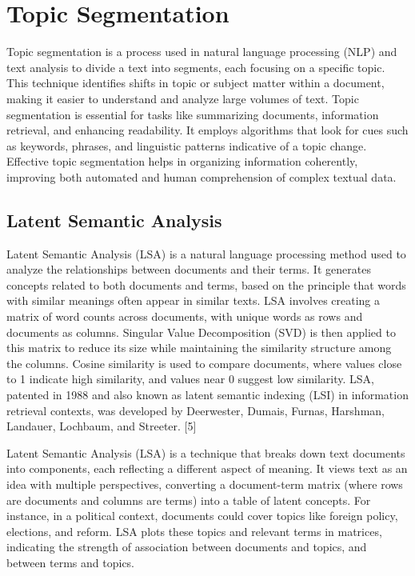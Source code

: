 \section*{Topic Segmentation}

Topic segmentation is a process used in natural language processing (NLP) and text analysis to divide a text into segments, each focusing on a specific topic. This technique identifies shifts in topic or subject matter within a document, making it easier to understand and analyze large volumes of text. Topic segmentation is essential for tasks like summarizing documents, information retrieval, and enhancing readability. It employs algorithms that look for cues such as keywords, phrases, and linguistic patterns indicative of a topic change. Effective topic segmentation helps in organizing information coherently, improving both automated and human comprehension of complex textual data.  




\subsection*{Latent Semantic Analysis}

Latent Semantic Analysis (LSA) is a natural language processing method used to analyze the relationships between documents and their terms. It generates concepts related to both documents and terms, based on the principle that words with similar meanings often appear in similar texts. LSA involves creating a matrix of word counts across documents, with unique words as rows and documents as columns. Singular Value Decomposition (SVD) is then applied to this matrix to reduce its size while maintaining the similarity structure among the columns. Cosine similarity is used to compare documents, where values close to 1 indicate high similarity, and values near 0 suggest low similarity. LSA, patented in 1988 and also known as latent semantic indexing (LSI) in information retrieval contexts, was developed by Deerwester, Dumais, Furnas, Harshman, Landauer, Lochbaum, and Streeter. [5]


Latent Semantic Analysis (LSA) is a technique that breaks down text documents into components, each reflecting a different aspect of meaning. It views text as an idea with multiple perspectives, converting a document-term matrix (where rows are documents and columns are terms) into a table of latent concepts. For instance, in a political context, documents could cover topics like foreign policy, elections, and reform. LSA plots these topics and relevant terms in matrices, indicating the strength of association between documents and topics, and between terms and topics.

